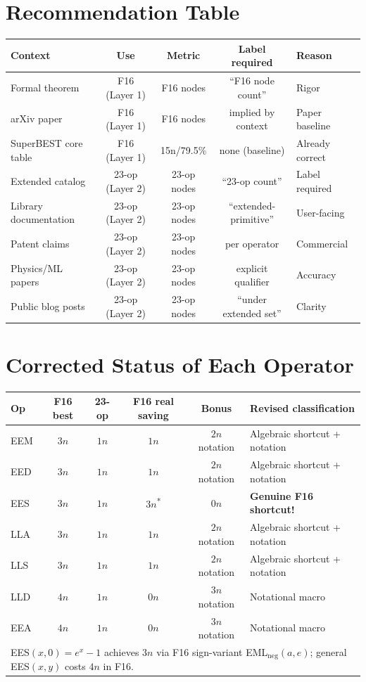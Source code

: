 \documentclass[11pt]{article}
\begin{document}
\section{Recommendation Table}

\begin{center}
\renewcommand{\arraystretch}{1.3}
\begin{tabular}{lcccl}
\toprule
Context & Use & Metric & Label required & Reason \\
\midrule
Formal theorem & F16 (Layer 1) & F16 nodes & ``F16 node count'' & Rigor \\
arXiv paper & F16 (Layer 1) & F16 nodes & implied by context & Paper baseline \\
SuperBEST core table & F16 (Layer 1) & 15n/79.5\% & none (baseline) & Already correct \\
Extended catalog & 23-op (Layer 2) & 23-op nodes & ``23-op count'' & Label required \\
Library documentation & 23-op (Layer 2) & 23-op nodes & ``extended-primitive'' & User-facing \\
Patent claims & 23-op (Layer 2) & 23-op nodes & per operator & Commercial \\
Physics/ML papers & 23-op (Layer 2) & 23-op nodes & explicit qualifier & Accuracy \\
Public blog posts & 23-op (Layer 2) & 23-op nodes & ``under extended set'' & Clarity \\
\bottomrule
\end{tabular}
\end{center}

\section{Corrected Status of Each Operator}

\begin{center}
\renewcommand{\arraystretch}{1.3}
\begin{tabular}{lccccl}
\toprule
Op & F16 best & 23-op & F16 real saving & Bonus & Revised classification \\
\midrule
EEM & $3n$ & $1n$ & $1n$ & $2n$ notation & Algebraic shortcut + notation \\
EED & $3n$ & $1n$ & $1n$ & $2n$ notation & Algebraic shortcut + notation \\
EES & $3n$ & $1n$ & $3n$\textsuperscript{*} & $0n$ & \textbf{Genuine F16 shortcut!} \\
LLA & $3n$ & $1n$ & $1n$ & $2n$ notation & Algebraic shortcut + notation \\
LLS & $3n$ & $1n$ & $1n$ & $2n$ notation & Algebraic shortcut + notation \\
LLD & $4n$ & $1n$ & $0n$ & $3n$ notation & Notational macro \\
EEA & $4n$ & $1n$ & $0n$ & $3n$ notation & Notational macro \\
\bottomrule
\multicolumn{6}{l}{\footnotesize *EES$(x,0)=e^x-1$ achieves $3n$ via F16 sign-variant EML$_{\mathrm{neg}}(a,e)$; general EES$(x,y)$ costs $4n$ in F16.}
\end{tabular}
\end{center}
\end{document}
